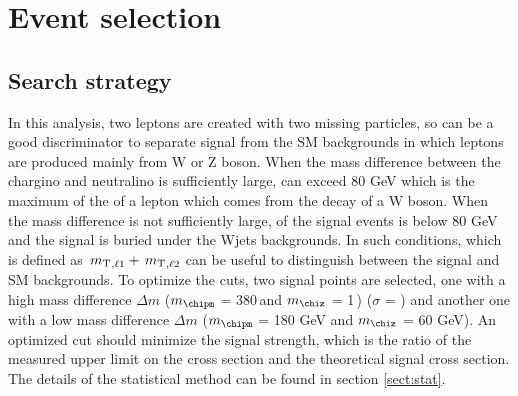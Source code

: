 \section{Event selection}
\label{sect:cuts}
\subsection{Search strategy}
In this analysis, two leptons are created with two missing particles, so \mttwo can be a good discriminator to separate signal 
from the SM backgrounds in which leptons are produced mainly from W or Z boson. When the mass difference between the chargino and neutralino 
is sufficiently large, \mttwo can exceed 80 GeV which is the maximum of the \mt of a lepton which comes from the decay of a W boson.
When the mass difference is not sufficiently large, \mttwo of the signal events is below 80 GeV and the signal is buried under the Wjets
backgrounds. In such conditions, \SumMT which is defined as $\,{m_{\rm T}}_{,\ell1} + \,{m_{\rm T}}_{,\ell2}$ can be useful to distinguish between the signal and 
SM backgrounds.
To optimize the cuts, two signal points are selected, one with a high mass difference 
$\Delta m$ ($m_{\chipm}$ = 380\,\GeV and $m_{\chiz}$ = 1\,\GeV) ($\sigma$ = ) and another one with a low mass difference 
$\Delta m$ ($m_{\chipm}$ = 180 GeV and $m_{\chiz}$ = 60 GeV). %
An optimized cut should minimize the signal strength, 
which is the ratio of the measured upper limit on the cross section and the theoretical signal cross section. The details of the statistical 
method can be found in section \ref{sect:stat}.

